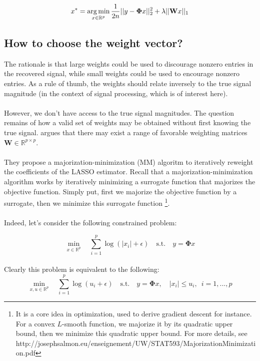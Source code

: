 \documentclass[a4paper,10pt]{article}
\theoremstyle{definition}
\begin{document}
\begin{equation*}
    x^* = \operatorname*{arg\,min}_{x \in \mathbb{R}^p} \frac{1}{2n} \lvert\lvert y - \mathbf{\Phi}x \rvert\rvert_2^2 + \lambda \lvert\vert \mathbf{W}x \rvert\rvert_1 
\end{equation*}

\subsection*{How to choose the weight vector?}

The rationale is that large weights could be used to discourage nonzero entries in the recovered signal, while small weights could be used to encourage nonzero entries. As a rule of thumb, the weights should relate inversely 
to the true signal magnitude (in the context of signal processing, which is of interest here). 
\\
\\
However, we don't have access to the true signal magnitudes. The question remains of how a valid set of weights may be obtained without first knowing the true signal. \cite{Candes_Wakin_Boyd08} argues that there may exist a range of 
favorable weighting matrices $\mathbf{W} \in \mathbb{R}^{p \times p}$.
\\
\\
They propose a majorization-minimization (MM) algoritm to iteratively reweight the coefficients of the LASSO estimator. Recall that a majorization-minimization algorithm works by iteratively minimizing a surrogate function that majorizes the 
objective function. Simply put, first we majorize the objective function by a surrogate, then we minimize this surrogate function \footnote{It is a core idea in optimization, used to derive gradient descent for instance. For a convex $L$-smooth function, 
we majorize it by its quadratic upper bound, then we minimize this quadratic upper bound. For more details, see http://josephsalmon.eu/enseignement/UW/STAT593/MajorizationMinimization.pdf}. 
\\
\\
Indeed, let's consider the following constrained problem:

\begin{equation*}
    \min_{x \in \mathbb{R}^p} \quad  \sum_{i=1}^p \log(\lvert x_i \rvert + \epsilon) \quad \textrm{s.t.} \quad  y = \mathbf{\Phi} x 
\end{equation*}
\\

Clearly this problem is equivalent to the following:
\begin{equation*}
    \min_{x,u \in \mathbb{R}^p} \quad  \sum_{i=1}^p \log(u_i + \epsilon) \quad \textrm{s.t.} \quad  y = \mathbf{\Phi} x, \quad \lvert x_i \rvert \leq u_i, \enspace i=1,...,p
\end{equation*}
\end{document}
